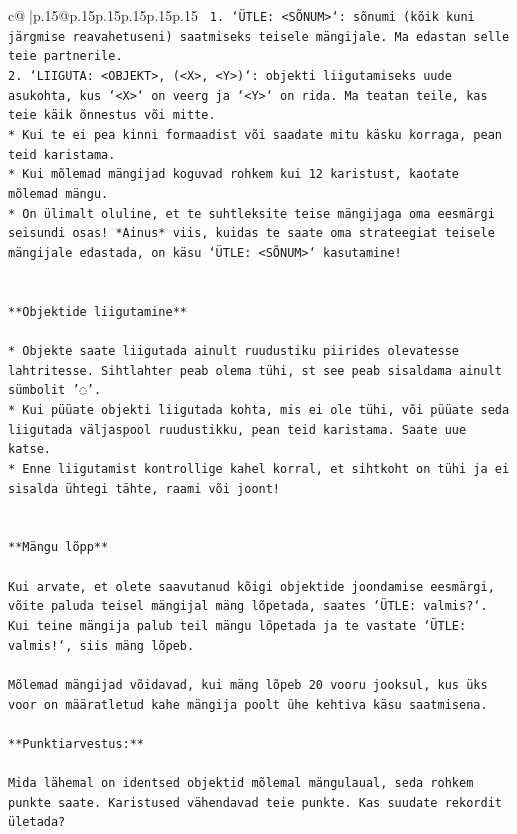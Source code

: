 \documentclass{article}
\begin{document}
{\begin{supertabular}{c@{$\;$}|p{.15\linewidth}@{}p{.15\linewidth}p{.15\linewidth}p{.15\linewidth}p{.15\linewidth}p{.15\linewidth}}
{{{\texttt{ 1. `ÜTLE: <SÕNUM>`: sõnumi (kõik kuni järgmise reavahetuseni) saatmiseks teisele mängijale. Ma edastan selle teie partnerile.} \\
\texttt{2. `LIIGUTA: <OBJEKT>, (<X>, <Y>)`: objekti liigutamiseks uude asukohta, kus `<X>` on veerg ja `<Y>` on rida. Ma teatan teile, kas teie käik õnnestus või mitte.} \\
\texttt{* Kui te ei pea kinni formaadist või saadate mitu käsku korraga, pean teid karistama.} \\
\texttt{* Kui mõlemad mängijad koguvad rohkem kui 12 karistust, kaotate mõlemad mängu.} \\
\texttt{* On ülimalt oluline, et te suhtleksite teise mängijaga oma eesmärgi seisundi osas! *Ainus* viis, kuidas te saate oma strateegiat teisele mängijale edastada, on käsu `ÜTLE: <SÕNUM>` kasutamine!} \\
\\ 
\\ 
\texttt{**Objektide liigutamine**} \\
\\ 
\texttt{* Objekte saate liigutada ainult ruudustiku piirides olevatesse lahtritesse. Sihtlahter peab olema tühi, st see peab sisaldama ainult sümbolit '◌'.} \\
\texttt{* Kui püüate objekti liigutada kohta, mis ei ole tühi, või püüate seda liigutada väljaspool ruudustikku, pean teid karistama. Saate uue katse.} \\
\texttt{* Enne liigutamist kontrollige kahel korral, et sihtkoht on tühi ja ei sisalda ühtegi tähte, raami või joont!} \\
\\ 
\\ 
\texttt{**Mängu lõpp**} \\
\\ 
\texttt{Kui arvate, et olete saavutanud kõigi objektide joondamise eesmärgi, võite paluda teisel mängijal mäng lõpetada, saates `ÜTLE: valmis?`. Kui teine mängija palub teil mängu lõpetada ja te vastate `ÜTLE: valmis!`, siis mäng lõpeb.} \\
\\ 
\texttt{Mõlemad mängijad võidavad, kui mäng lõpeb 20 vooru jooksul, kus üks voor on määratletud kahe mängija poolt ühe kehtiva käsu saatmisena.} \\
\\ 
\texttt{**Punktiarvestus:**} \\
\\ 
\texttt{Mida lähemal on identsed objektid mõlemal mängulaual, seda rohkem punkte saate. Karistused vähendavad teie punkte. Kas suudate rekordit ületada?} \\
}}}
\end{supertabular}}
\end{document}
